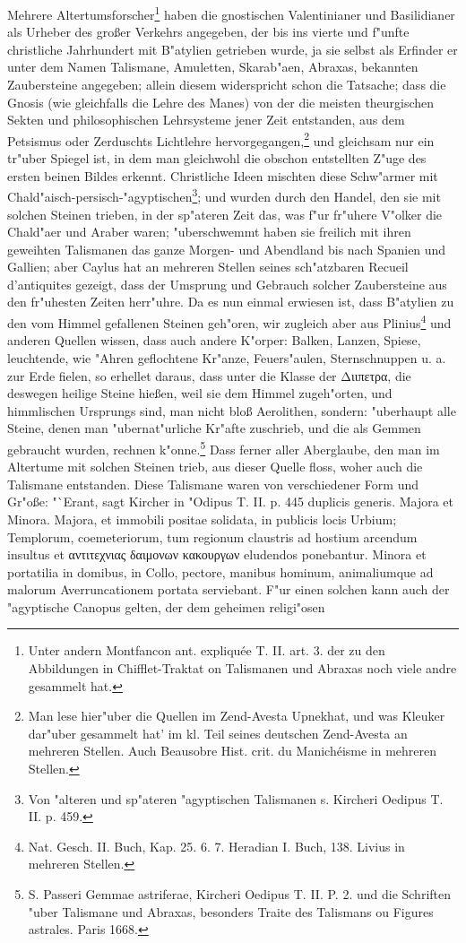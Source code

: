 \documentclass[a4paper, 11pt, oneside, polutonikogreek, german]{article}
\begin{document}
Mehrere Altertumsforscher\footnote{Unter andern Montfancon ant. expliquée T. II. art. 3. der zu den Abbildungen in Chifflet-Traktat on Talismanen und Abraxas noch viele andre gesammelt hat.} haben die gnostischen Valentinianer und Basilidianer als Urheber des großer Verkehrs angegeben, der bis ins vierte und f"unfte christliche Jahrhundert mit B"atylien getrieben wurde, ja sie selbst als Erfinder er unter dem Namen Talismane, Amuletten, Skarab"aen, Abraxas, bekannten Zaubersteine angegeben; allein diesem widerspricht schon die Tatsache; dass die Gnosis (wie gleichfalls die Lehre des Manes) von der die meisten theurgischen Sekten und philosophischen Lehrsysteme jener Zeit entstanden, aus dem Petsismus oder Zerduschts Lichtlehre hervorgegangen,\footnote{Man lese hier"uber die Quellen im Zend-Avesta Upnekhat, und was Kleuker dar"uber gesammelt hat' im kl. Teil seines deutschen Zend-Avesta an mehreren Stellen. Auch Beausobre Hist. crit. du Manichéisme in mehreren Stellen.} und gleichsam nur ein tr"uber Spiegel ist, in dem man gleichwohl die obschon entstellten Z"uge des ersten beinen Bildes erkennt. Christliche Ideen mischten diese Schw"armer mit Chald"aisch-persisch-"agyptischen\footnote{Von "alteren und sp"ateren "agyptischen Talismanen s. Kircheri Oedipus T. II. p. 459.}; und wurden durch den Handel, den sie mit solchen Steinen trieben, in der sp"ateren Zeit das, was f"ur fr"uhere V"olker die Chald"aer und Araber waren; "uberschwemmt haben sie freilich mit ihren geweihten Talismanen das ganze Morgen- und Abendland bis nach Spanien und Gallien; aber Caylus hat an mehreren Stellen seines sch"atzbaren Recueil d'antiquites gezeigt, dass der Umsprung und Gebrauch solcher Zaubersteine aus den fr"uhesten Zeiten herr"uhre. Da es nun einmal erwiesen ist, dass B"atylien zu den vom Himmel gefallenen Steinen geh"oren, wir zugleich aber aus Plinius\footnote{Nat. Gesch. II. Buch, Kap. 25. 6. 7. Heradian I. Buch, 138. Livius in mehreren Stellen.} und anderen Quellen wissen, dass auch andere K"orper: Balken, Lanzen, Spiese, leuchtende, wie "Ahren geflochtene Kr"anze, Feuers"aulen, Sternschnuppen u. a. zur Erde fielen, so erhellet daraus, dass unter die Klasse der Διιπετρα, die deswegen heilige Steine hießen, weil sie dem Himmel zugeh"orten, und himmlischen Ursprungs sind, man nicht bloß Aerolithen, sondern: "uberhaupt alle Steine, denen man "ubernat"urliche Kr"afte zuschrieb, und die als Gemmen gebraucht wurden, rechnen k"onne.\footnote{S. Passeri Gemmae astriferae, Kircheri Oedipus T. II. P. 2. und die Schriften "uber Talismane und Abraxas, besonders Traite des Talismans ou Figures astrales. Paris 1668.} Dass ferner aller Aberglaube, den man im Altertume mit solchen Steinen trieb, aus dieser Quelle floss, woher auch die Talismane entstanden. Diese Talismane waren von verschiedener Form und Gr"oße: "`Erant, sagt Kircher in "Odipus T. II. p. 445 duplicis generis. Majora et Minora. Majora, et immobili positae solidata, in publicis locis Urbium; Templorum, coemeteriorum, tum regionum claustris ad hostium arcendum insultus et αντιτεχνιας δαιμονων κακουργων eludendos ponebantur. Minora et portatilia in domibus, in Collo, pectore, manibus hominum, animaliumque ad malorum Averruncationem portata serviebant. F"ur einen solchen kann auch der "agyptische Canopus gelten, der dem geheimen religi"osen 
\end{document}
